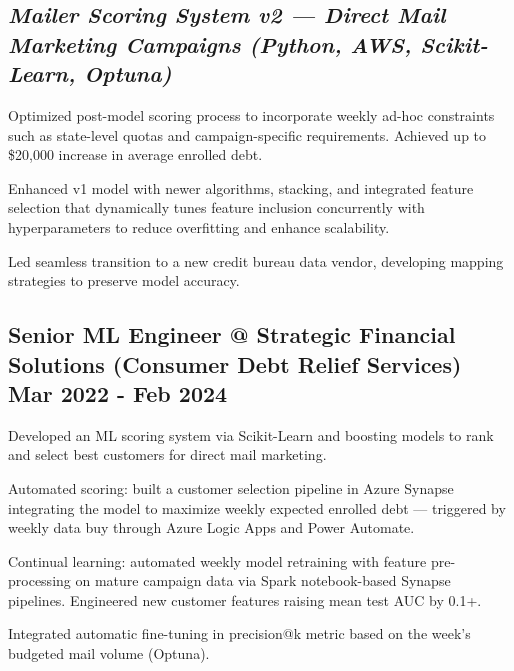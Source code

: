 \documentclass[letter,10pt]{article}
\begin{document}
\subsection{\textbf{\textit{Mailer Scoring System v2 — Direct Mail Marketing Campaigns   (Python, AWS, Scikit-Learn, Optuna)}}}
\vspace{0.1em}
\begin{zitemize}
\item Optimized post-model scoring process to incorporate weekly ad-hoc constraints such as state-level quotas and campaign-specific requirements. Achieved up to \$20,000 increase in average enrolled debt.
\item Enhanced v1 model with newer algorithms, stacking, and integrated feature selection that dynamically tunes feature inclusion concurrently with hyperparameters to reduce overfitting and enhance scalability.
\item Led seamless transition to a new credit bureau data vendor, developing mapping strategies to preserve model accuracy.
\end{zitemize}

\pagebreak
\subsection{Senior ML Engineer @ Strategic Financial Solutions (Consumer Debt Relief Services) \hfill Mar 2022 - Feb 2024}
\vspace{0.5em}
\begin{zitemize}
\item Developed an ML scoring system via Scikit-Learn and boosting models to rank and select best customers for direct mail marketing.
\item Automated scoring: built a customer selection pipeline in Azure Synapse integrating the model to maximize weekly expected enrolled debt — triggered by weekly data buy through Azure Logic Apps and Power Automate.
\item Continual learning: automated weekly model retraining with feature pre-processing on mature campaign data via Spark notebook-based Synapse pipelines. Engineered new customer features raising mean test AUC by 0.1+.
\item Integrated automatic fine-tuning in precision@k metric based on the week's budgeted mail volume (Optuna).
\end{zitemize}
\end{document}
